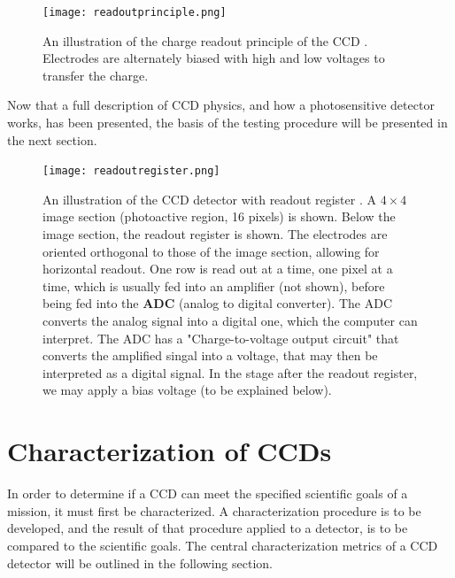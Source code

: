 \documentclass[../main.tex]{subfiles}
\begin{document}
	\begin{figure}
		\centering
		\texttt{[image: readoutprinciple.png]}
		\caption{An illustration of the charge readout principle of the CCD \cite{teledyneart}. Electrodes are alternately biased with high and low voltages to transfer the charge.
		} 
		\label{fig:ccdreadout}
	\end{figure}
	
	Now that a full description of CCD physics, and how a photosensitive detector works, has been presented, the basis of the testing procedure will be presented in the next section.
	
	\begin{figure}
		\centering
		\texttt{[image: readoutregister.png]}
		\caption{An illustration of the CCD detector with readout register \cite{teledyneart}. A $4\times4$ image section (photoactive region, 16 pixels) is shown. Below the image section, the readout register is shown. The electrodes are oriented orthogonal to those of the image section, allowing for horizontal readout. One row is read out at a time, one pixel at a time, which is usually fed into an amplifier (not shown), before being fed into the \textbf{ADC} (analog to digital converter). The ADC converts the analog signal into a digital one, which the computer can interpret. The ADC has a "Charge-to-voltage output circuit" that converts the amplified singal into a voltage, that may then be interpreted as a digital signal. In the stage after the readout register, we may apply a bias voltage (to be explained below).
		} 
		\label{fig:ccdreadreg}
	\end{figure}
	
	\section{Characterization of CCDs}
	In order to determine if a CCD can meet the specified scientific goals of a mission, it must first be characterized. A characterization procedure is to be developed, and the result of that procedure applied to a detector, is to be compared to the scientific goals. The central characterization metrics of a CCD detector will be outlined in the following section. 
	
\end{document}
